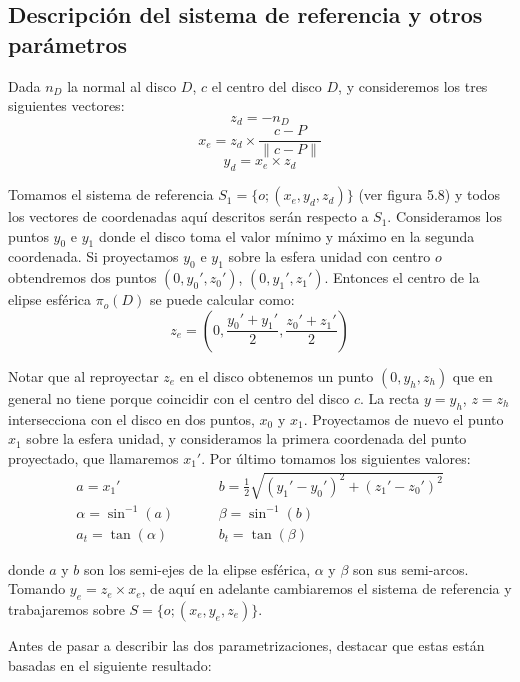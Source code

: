\subsection{Descripción del sistema de referencia y otros parámetros}

Dada $n_D$ la normal al disco $D$, $c$ el centro del disco $D$, y consideremos los tres siguientes vectores:
$$z_d = -n_D $$
$$x_e = z_d\times \frac{c-P}{\|c-P\|} $$
$$y_d = x_e\times z_d $$

Tomamos el sistema de referencia $S_1=\{o;(x_e, y_d, z_d)\}$ (ver figura 5.8) y todos los vectores de coordenadas aquí descritos serán respecto a $S_1$. Consideramos los puntos $y_0$ e $y_1$ donde el disco toma el valor mínimo y máximo en la segunda coordenada. Si proyectamos $y_0$ e $y_1$ sobre la esfera unidad con centro $o$ obtendremos dos puntos $(0,y_0',z_0')$, $(0,y_1',z_1')$. Entonces el centro de la elipse esférica $\pi_o(D)$ se puede calcular como:
$$z_e = (0,\frac{y_0'+y_1'}{2}, \frac{z_0' + z_1'}{2}) $$

Notar que al reproyectar $z_e$ en el disco obtenemos un punto $(0,y_h,z_h)$ que en general no tiene porque coincidir con el centro del disco $c$. La recta $y = y_h$, $z=z_h$ intersecciona con el disco en dos puntos, $x_0$ y $x_1$. Proyectamos de nuevo el punto $x_1$ sobre la esfera unidad, y consideramos la primera coordenada del punto proyectado, que llamaremos $x_1'$. Por último tomamos los siguientes valores:
\begin{align*}
a = x_1'&\hspace{1cm} b=\frac{1}{2}\sqrt{(y_1'-y_0')^2 + (z_1'-z_0')^2}\\
\alpha = \sin^{-1}(a)&\hspace{1cm} \beta=\sin^{-1}(b)\\
a_t = \tan(\alpha) &\hspace{1cm}b_t=\tan(\beta)
\end{align*}

donde $a$ y $b$ son los semi-ejes de la elipse esférica, $\alpha$ y $\beta$ son sus semi-arcos. Tomando $y_e=z_e\times x_e$, de aquí en adelante cambiaremos el sistema de referencia y trabajaremos sobre $S=\{o;(x_e, y_e, z_e)\}$.

Antes de pasar a describir las dos parametrizaciones, destacar que estas están basadas en el siguiente resultado:

